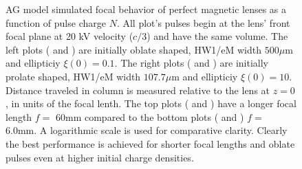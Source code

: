
\begin{figure}
  \centering
  \centerline{
  }
  \centerline{
  }
  \caption[AG model simulated focal behavior of perfect magnetic lenses as a function of pulse charge $N$]{
    AG model simulated focal behavior of perfect magnetic lenses as a function of pulse charge $N$.
    All plot's pulses begin at the lens' front focal plane at 20 kV velocity ($c/3$) and have the same volume.
    The left plots ( and ) are initially oblate shaped, HW1/eM width $ 500 \mu \text{m}$ and ellipticiy $ \xi ( 0 ) = 0.1 $.
    The right plots ( and ) are initially prolate shaped, HW1/eM width $ 107.7 \mu \text{m}$ and ellipticiy $ \xi ( 0 ) = 10 $.
    Distance traveled in column is measured relative to the lens at $z=0$, in units of the focal lenth.
    The top plots ( and ) have a longer focal length $f = $ 60mm compared to the bottom plots ( and ) $ f = $ 6.0mm.
    A logarithmic scale is used for comparative clarity.
    Clearly the best performance is achieved for shorter focal lengths and oblate pulses even at higher initial charge densities.
  }
  \label{fig:focus_lens_charge}
\end{figure}
